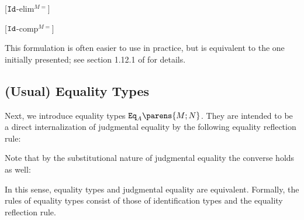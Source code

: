 \documentclass[11pt]{article}
\begin{document}
\begin{prooftree*}
	[$\idtype$-elim$^{M=}$]{}
\end{prooftree*}
\begin{prooftree*}
	[$\idtype$-comp$^{M=}$]{}
\end{prooftree*}

This formulation is often easier to use in practice, but is equivalent to the one initially presented; see section 1.12.1 of \cite{hott-as:book} for details.

\subsection{(Usual) Equality Types}

Next, we introduce equality types $\mathtt{Eq}_A\parens{M; N}$. They are intended to be a direct internalization of judgmental equality by the following equality reflection rule:

\begin{prooftree*}
\end{prooftree*}

Note that by the substitutional nature of judgmental equality the converse holds as well:

\begin{prooftree*}
\end{prooftree*}

In this sense, equality types and judgmental equality are equivalent. Formally, the rules of equality types consist of those of identification types and the equality reflection rule.
\end{document}
